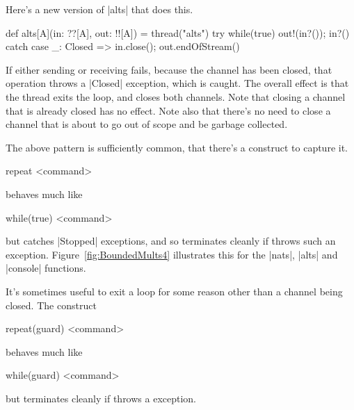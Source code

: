 Here's a new version of |alts| that does this.
%
\begin{scala}
  def alts[A](in: ??[A], out: !![A]) = thread("alts"){ 
    try{ while(true){ out!(in?()); in?() } } 
    catch{ case _: Closed => in.close(); out.endOfStream() }
  }
\end{scala}
% 
If either sending or receiving fails, because the channel has been closed,
that operation throws a |Closed| exception, which is caught.  The overall
effect is that the thread exits the loop, and closes both channels.  
%
Note that closing a channel that is already closed has no effect.
Note also that there's no need to close a channel that is about to go out of
scope and be garbage collected. 

The above pattern is sufficiently common, that there's a construct to capture
it.
%
\begin{scala}
  repeat{ <command> }
\end{scala}
%
behaves much like
\begin{scala}
  while(true){ <command> }
\end{scala}
but catches |Stopped| exceptions, and so terminates cleanly if
 throws such an exception.  Figure~\ref{fig:BoundedMults4}
illustrates this for the |nats|, |alts| and |console| functions.


It's sometimes useful to exit a loop for some reason other than a channel
being closed.  The construct
%
\begin{scala}
  repeat(guard){ <command> }
\end{scala}
%
behaves much like
\begin{scala}
  while(guard){ <command> }
\end{scala}
but terminates cleanly if  throws a 
exception.


